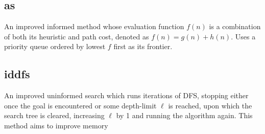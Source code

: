 \subsection{\texorpdfstring{\acrfull{as}}{A*}} %
\label{sub:as}
An improved \gls{informed} method whose evaluation function $f(n)$ is a combination of both its heuristic and path cost, denoted as $f(n)=g(n) + h(n)$. Uses a priority queue ordered by lowest $f$ first as its frontier.

\subsection{\texorpdfstring{\acrfull{iddfs}}{IDDFS}} %
\label{sub:iddfs}
An improved uninformed search which runs iterations of DFS, stopping either once the goal is encountered or some depth-limit $\ell$ is reached, upon which the search tree is cleared, increasing $\ell$ by 1 and running the algorithm again. This method aims to improve memory


